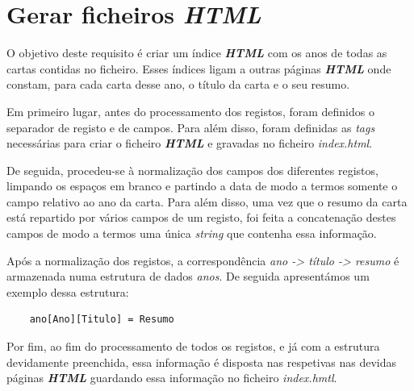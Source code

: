 \documentclass[11pt,a4paper]{report}
\begin{document}
\section{Gerar ficheiros \textit{HTML}}

\quad O objetivo deste requisito é criar um índice \textit{\textbf{HTML}} com os anos de todas as cartas contidas no ficheiro. Esses índices ligam a outras páginas \textbf{\textit{HTML}} onde constam, para cada carta desse ano, o título da carta e o seu resumo.

\quad Em primeiro lugar, antes do processamento dos registos, foram definidos o separador de registo e de campos. Para além disso, foram definidas as \textit{tags} necessárias para criar o ficheiro \textbf{\textit{HTML}} e gravadas no ficheiro \textit{index.html}.

\quad De seguida, procedeu-se à normalização dos campos dos diferentes registos, limpando os espaços em branco e partindo a data de modo a termos somente o campo relativo ao ano da carta. Para além disso, uma vez que o resumo da carta está repartido por vários campos de um registo, foi feita a concatenação destes campos de modo a termos uma única \textit{string} que contenha essa informação.

\quad Após a normalização dos registos, a correspondência \textit{ano -> título -> resumo} é armazenada numa estrutura de dados \textit{anos}. De seguida apresentámos um exemplo dessa estrutura:

\begin{verbatim}
    ano[Ano][Titulo] = Resumo
\end{verbatim}

\quad Por fim, ao fim do processamento de todos os registos, e já com a estrutura devidamente preenchida, essa informação é disposta nas respetivas nas devidas páginas \textbf{\textit{HTML}} guardando essa informação no ficheiro \textit{index.hmtl}.
\end{document}
